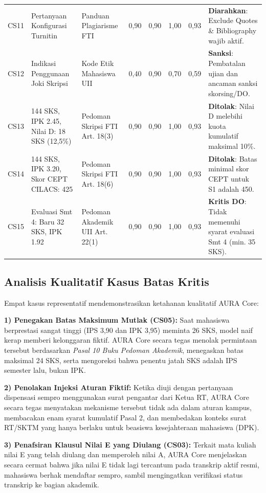 \documentclass[conference]{IEEEtran}
\begin{document}
\begin{table}[htbp]
\begin{tabularx}{\textwidth}{c p{3.8cm} p{3.5cm} cccc X}
CS11 & Pertanyaan Konfigurasi Turnitin & Panduan Plagiarisme FTI & 0,90 & 0,90 & 1,00 & 0,93 & \textbf{Diarahkan}: Exclude Quotes \& Bibliography wajib aktif. \\
CS12 & Indikasi Penggunaan Joki Skripsi & Kode Etik Mahasiswa UII & 0,40 & 0,90 & 0,70 & 0,59 & \textbf{Sanksi}: Pembatalan ujian dan ancaman sanksi skorsing/DO. \\
CS13 & 144 SKS, IPK 2.45, Nilai D: 18 SKS (12,5\%) & Pedoman Skripsi FTI Art. 18(3) & 0,90 & 0,90 & 1,00 & 0,93 & \textbf{Ditolak}: Nilai D melebihi kuota kumulatif maksimal 10\%. \\
CS14 & 144 SKS, IPK 3.20, Skor CEPT CILACS: 425 & Pedoman Skripsi FTI Art. 18(6) & 0,90 & 0,90 & 1,00 & 0,93 & \textbf{Ditolak}: Batas minimal skor CEPT untuk S1 adalah 450. \\
CS15 & Evaluasi Smt 4: Baru 32 SKS, IPK 1.92 & Pedoman Akademik UII Art. 22(1) & 0,90 & 0,90 & 1,00 & 0,93 & \textbf{Kritis DO}: Tidak memenuhi syarat evaluasi Smt 4 (min. 35 SKS). \\
\bottomrule
\end{tabularx}
\end{table}

\subsection{Analisis Kualitatif Kasus Batas Kritis}
Empat kasus representatif mendemonstrasikan ketahanan kualitatif AURA Core:

\textbf{1) Penegakan Batas Maksimum Mutlak (CS05):} Saat mahasiswa berprestasi sangat tinggi (IPS 3,90 dan IPK 3,95) meminta 26 SKS, model naif kerap memberi kelonggaran fiktif. AURA Core secara tegas menolak permintaan tersebut berdasarkan \textit{Pasal 10 Buku Pedoman Akademik}, menegaskan batas maksimal 24 SKS, serta mengoreksi bahwa penentu jatah SKS adalah IPS semester lalu, bukan IPK.

\textbf{2) Penolakan Injeksi Aturan Fiktif:} Ketika diuji dengan pertanyaan dispensasi sempro menggunakan surat pengantar dari Ketua RT, AURA Core secara tegas menyatakan mekanisme tersebut tidak ada dalam aturan kampus, membacakan enam syarat kumulatif Pasal 2, dan membedakan konteks surat RT/SKTM yang hanya berlaku untuk beasiswa kesejahteraan mahasiswa (DPK).

\textbf{3) Penafsiran Klausul Nilai E yang Diulang (CS03):} Terkait mata kuliah nilai E yang telah diulang dan memperoleh nilai A, AURA Core menjelaskan secara cermat bahwa jika nilai E tidak lagi tercantum pada transkrip aktif resmi, mahasiswa berhak mendaftar sempro, sambil mengingatkan verifikasi status transkrip ke bagian akademik.
\end{document}

